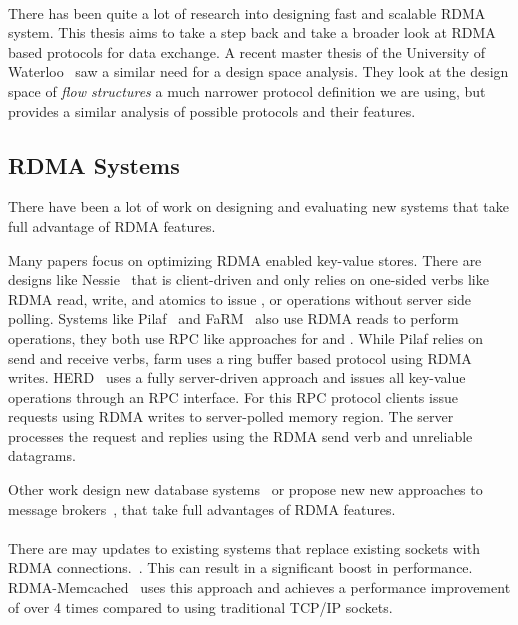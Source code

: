 \paragraph{} There has been quite a lot of research into designing fast and scalable RDMA system. This thesis aims to take
a step back and take a broader look at RDMA based protocols for data exchange. A recent master thesis of the University of 
Waterloo~\cite{sharma2020design} saw a similar need for a design space analysis. They look at the design space of \emph{flow structures} 
a much narrower protocol definition we are using, but provides a similar analysis of possible protocols and their features.


\subsection{RDMA Systems}

There have been a lot of work on designing and evaluating new systems that take full advantage of RDMA features.

Many papers focus on optimizing RDMA enabled key-value stores. There are designs like Nessie~\cite{nessie} that is 
client-driven and only relies on one-sided verbs like RDMA read, write, and atomics to issue , 
or  operations without server side polling.
Systems like Pilaf~\cite{pilaf} and FaRM~\cite{farm} also use RDMA reads to perform  operations, they both use 
RPC like approaches for  and . While Pilaf relies on send and receive verbs, farm uses a ring buffer
based protocol using RDMA writes.
HERD~\cite{herd} uses a fully server-driven approach and issues all key-value operations through an RPC interface. For this
RPC protocol clients issue requests using RDMA writes to server-polled memory region. The server processes the request and
replies using the RDMA send verb and unreliable datagrams.

Other work design new database systems~\cite{dbrackjoin} or propose new new approaches to message brokers~\cite{broker},
that take full advantages of RDMA features. 

\paragraph{} There are may updates to existing systems that replace existing sockets with RDMA 
connections.~\cite{memcached, hbase, hdfs}. This can result in a significant boost in performance. RDMA-Memcached~\cite{memcached} 
uses this approach and achieves a performance improvement of over 4 times compared to using traditional TCP/IP sockets.

